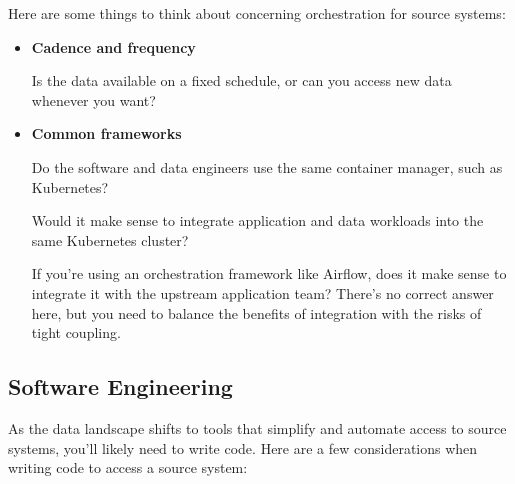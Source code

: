 Here are some things to think about concerning orchestration for
source systems:
\begin{itemize}
    \item \textbf{Cadence and frequency}
    
    \noindent
    Is the data available on a fixed schedule, or can you access
    new data whenever you want?


    \item \textbf{Common frameworks}
    
    \noindent
    Do the software and data engineers use the same container
    manager, such as Kubernetes?
    
    Would it make sense to integrate application and data
    workloads into the same Kubernetes cluster?

    If you're using an orchestration framework like Airflow, does
    it make sense to integrate it with the upstream application
    team? There's no correct answer here, but you need to balance
    the benefits of integration with the risks of tight coupling.
\end{itemize}


\subsection*{Software Engineering}
As the data landscape shifts to tools that simplify and automate
access to source systems, you'll likely need to write code.
Here are a few considerations when writing code to access a
source system:


